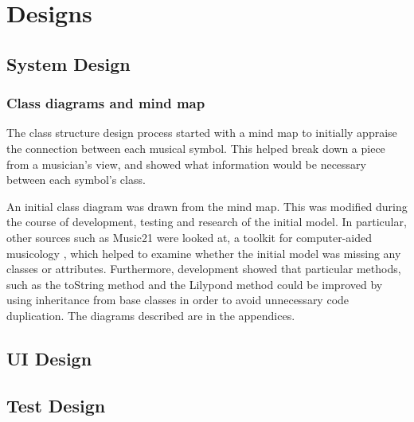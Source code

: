 \section{Designs}
\subsection{System Design}
\subsubsection{Class diagrams and mind map}
The class structure design process started with a mind map to initially appraise the connection between each musical symbol. This helped break down a piece from a musician's view, and showed what information would be necessary between each symbol's class.

An initial class diagram was drawn from the mind map. This was modified during the course of development, testing and research of the initial model. In particular, other sources such as Music21 were looked at, a toolkit for computer-aided musicology \parencite{Music21}, which helped to examine whether the initial model was missing any classes or attributes. Furthermore, development showed that particular methods, such as the toString method and the Lilypond method could be improved by using inheritance from base classes in order to avoid unnecessary code duplication. The diagrams described are in the appendices. 
\subsection{UI Design}

\subsection{Test Design}
